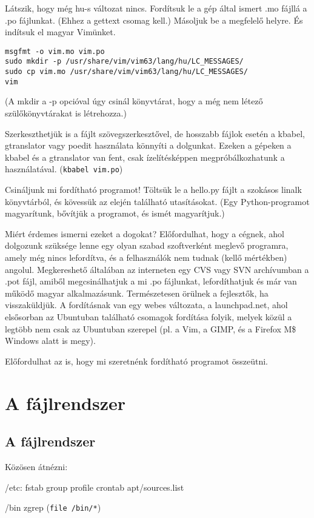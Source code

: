 \documentclass[a4paper]{article}
\newcommand{\code}{\texttt}
\begin{document}
Látszik, hogy még hu-s változat nincs. Fordítsuk le a gép által ismert
.mo fájllá a .po fájlunkat. (Ehhez a gettext csomag kell.) Másoljuk be
a megfelelő helyre. És indítsuk el magyar Vimünket.
\begin{Verbatim}
msgfmt -o vim.mo vim.po
sudo mkdir -p /usr/share/vim/vim63/lang/hu/LC_MESSAGES/
sudo cp vim.mo /usr/share/vim/vim63/lang/hu/LC_MESSAGES/
vim
\end{Verbatim}
(A mkdir a -p opcióval úgy csinál könyvtárat, hogy a még nem létező
szülőkönyvtárakat is létrehozza.)

Szerkeszthetjük is a fájlt szövegszerkesztővel, de hosszabb fájlok
esetén a kbabel, gtranslator vagy poedit használata könnyíti a
dolgunkat. Ezeken a gépeken a kbabel és a gtranslator van fent, csak ízelítésképpen
megpróbálkozhatunk a használatával. (\code{kbabel vim.po})

Csináljunk mi fordítható programot! Töltsük le a hello.py
fájlt a szokásos linalk könyvtárból, és kövessük az elején található
utasításokat.  (Egy Python-programot  magyarítunk, bővítjük a programot,
és ismét magyarítjuk.)

Miért érdemes ismerni ezeket a dogokat? Előfordulhat, hogy a cégnek,
ahol dolgozunk szüksége lenne egy olyan szabad szoftverként meglevő
programra, amely még nincs lefordítva, és a felhasználók nem tudnak
(kellő mértékben) angolul. Megkereshető általában az interneten egy CVS
vagy SVN archívumban a .pot fájl, amiből megcsinálhatjuk a mi .po
fájlunkat, lefordíthatjuk és már van működő magyar alkalmazásunk.
Természetesen örülnek a fejlesztők, ha visszaküldjük. A fordításnak van
egy webes változata, a launchpad.net, ahol elsősorban az Ubuntuban
található csomagok fordítása folyik, melyek közül a legtöbb nem csak az
Ubuntuban szerepel (pl. a Vim, a GIMP, és a Firefox M\$ Windows alatt is
megy).

Előfordulhat az is, hogy mi szeretnénk fordítható programot összeütni.

\newpage
\section{A fájlrendszer}

\subsection{A fájlrendszer}
Közösen átnézni:

/etc: fstab group profile crontab apt/sources.list

/bin zgrep (\code{file /bin/*})
\end{document}

